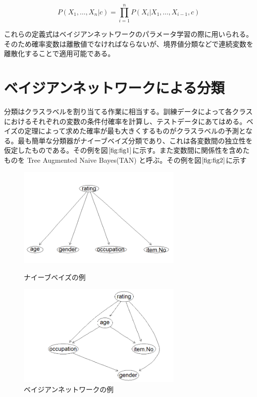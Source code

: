 \documentclass[a4paper,12pt]{jarticle}
\begin{document}
\begin{equation}
\label{eq:eq2}
P(X_1, \ldots, X_n|c) = \prod_{i=1}^n P(X_i|X_1, \ldots, X_{i-1},c)
\end{equation}

これらの定義式はベイジアンネットワークのパラメータ学習の際に用いられる。そのため確率変数は離散値でなければならないが、境界値分類などで連続変数を離散化することで適用可能である。

\section{ベイジアンネットワークによる分類}

分類はクラスラベルを割り当てる作業に相当する。訓練データによって各クラスにおけるそれぞれの変数の条件付確率を計算し、テストデータにあてはめる。ベイズの定理によって求めた確率が最も大きくするものがクラスラベルの予測となる。最も簡単な分類器がナイーブベイズ分類であり、これは各変数間の独立性を仮定したものである。その例を図$\ref{fig:fig1}$に示す。また変数間に関係性を含めたものを Tree Augmented Naive Bayes(TAN) と呼ぶ。その例を図$\ref{fig:fig2}$に示す

\begin{figure}[H]
\begin{minipage}{0.5\hsize}
 \begin{center}
  \includegraphics[width=80mm]{data/sample1.png}
 \end{center}
 \caption{ナイーブベイズの例}
 \label{fig:fig1}
 \end{minipage}
\begin{minipage}{0.5\hsize}
 \begin{center}
  \includegraphics[width=80mm]{data/sample2.png}
 \end{center}
 \caption{ベイジアンネットワークの例}
 \label{fig:fig2}
 \end{minipage}
\end{figure}
\end{document}
